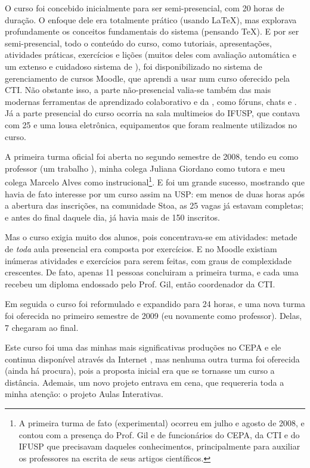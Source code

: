 O curso foi concebido inicialmente para ser semi-presencial, com 20 horas de duração. O enfoque dele era totalmente prático (usando \LaTeX), mas explorava profundamente os conceitos fundamentais do sistema (pensando \TeX). E por ser semi-presencial, todo o conteúdo do curso, como tutoriais, apresentações, atividades práticas, exercícios e lições (muitos deles com avaliação automática e um extenso e cuidadoso sistema de ), foi disponibilizado no sistema de gerenciamento de cursos Moodle, que aprendi a usar num curso oferecido pela CTI. Não obstante isso, a parte não-presencial valia-se também das mais modernas ferramentas de aprendizado colaborativo e da , como fóruns, chats e . Já a parte presencial do curso ocorria na sala multimeios do IFUSP, que contava com 25  e uma lousa eletrônica, equipamentos que foram realmente utilizados no curso.

A primeira turma oficial foi aberta no segundo semestre de 2008, tendo eu como professor (um trabalho ), minha colega Juliana Giordano como tutora e meu colega Marcelo Alves como  instrucional\footnote{A primeira turma de fato (experimental) ocorreu em julho e agosto de 2008, e contou com a presença do Prof. Gil e de funcionários do CEPA, da CTI e do IFUSP que precisavam daqueles conhecimentos, principalmente para auxiliar os professores na escrita de seus artigos científicos.}. E foi um grande sucesso, mostrando que havia de fato interesse por um curso assim na USP: em menos de duas horas após a abertura das inscrições, na comunidade Stoa, as 25 vagas já estavam completas; e antes do final daquele dia, já havia mais de 150 inscritos.

Mas o curso exigia muito dos alunos, pois concentrava-se em atividades: metade de \emph{toda} aula presencial era composta por exercícios. E no Moodle existiam inúmeras atividades e exercícios para serem feitas, com graus de complexidade crescentes. De fato, apenas 11 pessoas concluiram a primeira turma, e cada uma recebeu um diploma endossado pelo Prof. Gil, então coordenador da CTI.

Em seguida o curso foi reformulado e expandido para 24 horas, e uma nova turma foi oferecida no primeiro semestre de 2009 (eu novamente como professor). Delas, 7 chegaram ao final.

Este curso foi uma das minhas mais significativas produções no CEPA e ele continua disponível através da Internet \cite{curso-LaTeX}, mas nenhuma outra turma foi oferecida (ainda há procura), pois a proposta inicial era que se tornasse um curso a distância. Ademais, um novo projeto entrava em cena, que requereria toda a minha atenção: o projeto Aulas Interativas.

